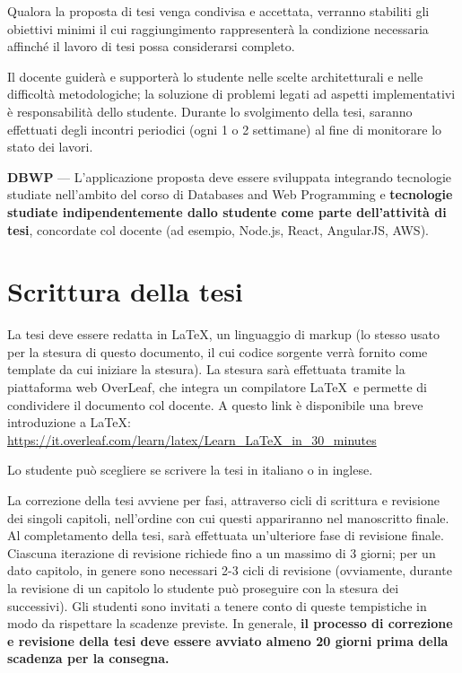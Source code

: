 Qualora la proposta di tesi venga condivisa e accettata, verranno stabiliti gli obiettivi minimi il cui raggiungimento rappresenterà la condizione necessaria affinché il lavoro di tesi possa considerarsi completo. 

Il docente guiderà e supporterà lo studente nelle scelte architetturali e nelle difficoltà metodologiche; la soluzione di problemi legati ad aspetti implementativi è responsabilità dello studente. Durante lo svolgimento della tesi, saranno effettuati degli incontri periodici (ogni 1 o 2 settimane) al fine di monitorare lo stato dei lavori.

\noindent\textbf{DBWP} --- L'applicazione proposta deve essere sviluppata integrando tecnologie studiate nell'ambito del corso di Databases and Web Programming e \textbf{tecnologie studiate indipendentemente dallo studente come parte dell'attività di tesi}, concordate col docente (ad esempio, Node.js, React, AngularJS, AWS).

\section{Scrittura della tesi}

La tesi deve essere redatta in \LaTeX, un linguaggio di markup (lo stesso usato per la stesura di questo documento, il cui codice sorgente verrà fornito come template da cui iniziare la stesura). La stesura sarà effettuata tramite la piattaforma web OverLeaf, che integra un compilatore \LaTeX~e permette di condividere il documento col docente. A questo link è disponibile una breve introduzione a \LaTeX: \url{https://it.overleaf.com/learn/latex/Learn_LaTeX_in_30_minutes}

Lo studente può scegliere se scrivere la tesi in italiano o in inglese.

La correzione della tesi avviene per fasi, attraverso cicli di scrittura e revisione dei singoli capitoli, nell'ordine con cui questi appariranno nel manoscritto finale. Al completamento della tesi, sarà effettuata un'ulteriore fase di revisione finale. Ciascuna iterazione di revisione richiede fino a un massimo di 3 giorni; per un dato capitolo, in genere sono necessari 2-3 cicli di revisione (ovviamente, durante la revisione di un capitolo lo studente può proseguire con la stesura dei successivi). Gli studenti sono invitati a tenere conto di queste tempistiche in modo da rispettare la scadenze previste. In generale, \textbf{il processo di correzione e revisione della tesi deve essere avviato almeno 20 giorni prima della scadenza per la consegna.}

